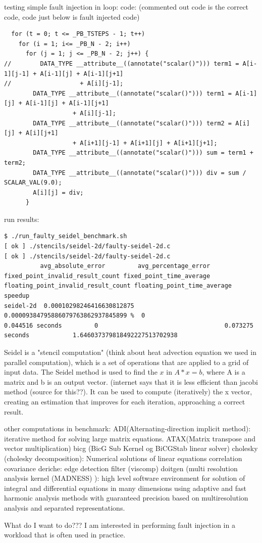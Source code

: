 testing simple fault injection in loop:
code: (commented out code is the correct code, code just below is fault injected code)
\begin{verbatim}
  for (t = 0; t <= _PB_TSTEPS - 1; t++)
    for (i = 1; i<= _PB_N - 2; i++)
      for (j = 1; j <= _PB_N - 2; j++) {
//        DATA_TYPE __attribute__((annotate("scalar()"))) term1 = A[i-1][j-1] + A[i-1][j] + A[i-1][j+1]
//                   + A[i][j-1];
        DATA_TYPE __attribute__((annotate("scalar()"))) term1 = A[i-1][j] + A[i-1][j] + A[i-1][j+1]
                   + A[i][j-1];
        DATA_TYPE __attribute__((annotate("scalar()"))) term2 = A[i][j] + A[i][j+1]
                   + A[i+1][j-1] + A[i+1][j] + A[i+1][j+1];
        DATA_TYPE __attribute__((annotate("scalar()"))) sum = term1 + term2;
        DATA_TYPE __attribute__((annotate("scalar()"))) div = sum / SCALAR_VAL(9.0);
        A[i][j] = div;
      }
\end{verbatim}
run results:
\begin{verbatim}
$ ./run_faulty_seidel_benchmark.sh 
[ ok ] ./stencils/seidel-2d/faulty-seidel-2d.c
[ ok ] ./stencils/seidel-2d/faulty-seidel-2d.c
          avg_absolute_error         avg_percentage_error                  fixed_point_invalid_result_count fixed_point_time_average floating_point_invalid_result_count floating_point_time_average speedup                       
seidel-2d  0.00010298246416630812875  0.00009384795886079763862937845899 %  0                                0.044516 seconds         0                                   0.073275 seconds            1.646037379818492227513702938

\end{verbatim}


Seidel is a "stencil computation" (think about heat advection equation we used in parallel computation), which is a set of operations that are applied to a grid of input data. The Seidel method is used to find the $x$ in $A * x = b$, where A is a matrix and b is an output vector. (internet says that it is less efficient than jacobi method (source for this??). It can be used to compute (iteratively) the x vector, creating an estimation that improves for each iteration, approaching a correct result.


other computations in benchmark:
ADI(Alternating-direction implicit method): iterative method for solving large matrix equations.
ATAX(Matrix transpose and vector multiplication)
bicg (BicG Sub Kernel og BiCGStab linear solver)
cholesky (cholesky decomposition): Numerical solutions of linear equations
correlation
covariance
deriche: edge detection filter (viscomp)
doitgen (multi resolution analysis kernel (MADNESS) ): high level software environment for solution of integral and     differential equations in many dimensions using adaptive and fast harmonic analysis methods with guaranteed
   precision based on multiresolution analysis and separated representations. 


What do I want to do??? I am interested in performing fault injection in a workload that is often used in practice. 
